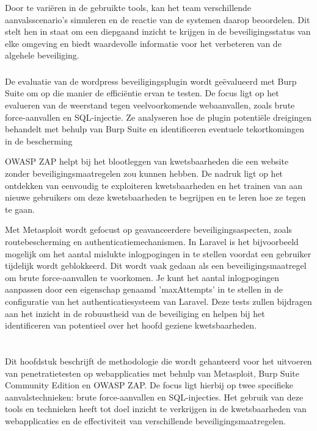 Door te variëren in de gebruikte tools, kan het team verschillende aanvalsscenario's simuleren en de reactie van de systemen daarop beoordelen. Dit 
stelt hen in staat om een diepgaand inzicht te krijgen in de beveiligingsstatus van elke omgeving en biedt waardevolle informatie voor het verbeteren 
van de algehele beveiliging.

\subsubsection{}
De evaluatie van de wordpress beveiligingsplugin wordt geëvalueerd met Burp Suite om op die manier de efficiëntie ervan te testen. De focus ligt op het evalueren van de weerstand 
tegen veelvoorkomende webaanvallen, zoals brute force-aanvallen en SQL-injectie. Ze analyseren hoe de plugin potentiële dreigingen behandelt met 
behulp van Burp Suite en identificeren eventuele tekortkomingen in de bescherming

OWASP ZAP helpt bij het blootleggen van kwetsbaarheden die een website zonder beveiligingsmaatregelen zou kunnen hebben. De nadruk ligt op het 
ontdekken van eenvoudig te exploiteren kwetsbaarheden en het trainen van aan nieuwe gebruikers om deze kwetsbaarheden te begrijpen en 
te leren hoe ze tegen te gaan.

Met Metasploit wordt gefocust op geavanceerdere beveiligingsaspecten, zoals routebescherming en authenticatiemechanismen.
In Laravel is het bijvoorbeeld mogelijk om het aantal mislukte inlogpogingen in te stellen voordat een gebruiker tijdelijk wordt geblokkeerd. Dit wordt vaak gedaan 
als een beveiligingsmaatregel om brute force-aanvallen te voorkomen. Je kunt het aantal inlogpogingen aanpassen door een eigenschap genaamd 
'maxAttempts' in te stellen in de configuratie van het authenticatiesysteem van Laravel. Deze tests zullen 
bijdragen aan het inzicht in de robuustheid van de beveiliging en helpen bij het identificeren van potentieel over het hoofd geziene kwetsbaarheden.

\section{}
Dit hoofdstuk beschrijft de methodologie die wordt gehanteerd voor het uitvoeren van penetratietesten op webapplicaties met behulp van Metasploit, 
Burp Suite Community Edition en OWASP ZAP. De focus ligt hierbij op twee specifieke aanvalstechnieken: brute force-aanvallen en SQL-injecties. 
Het gebruik van deze tools en technieken heeft tot doel inzicht te verkrijgen in de kwetsbaarheden van webapplicaties en de effectiviteit van 
verschillende beveiligingsmaatregelen.

